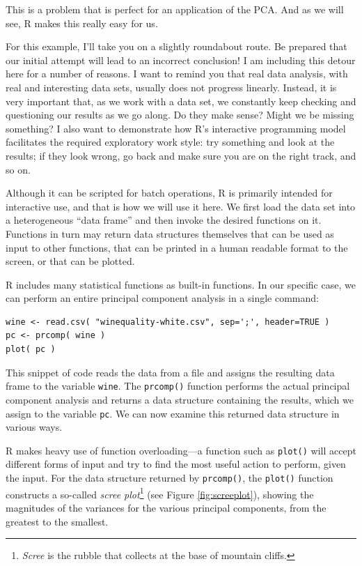This is a problem that is perfect for an application of the PCA. And
as we will see, R makes this really easy for us.

For this example, I'll take you on a slightly roundabout route.  Be
prepared that our initial attempt will lead to an incorrect
conclusion! I am including this detour here for a number of reasons.
I want to remind you that real data analysis, with real and
interesting data sets, usually does not progress linearly.  Instead,
it is very important that, as we work with a data set, we constantly
keep checking and questioning our results as we go along. Do they make
sense? Might we be missing something?  I also want to demonstrate how
R's interactive programming model facilitates the required exploratory
work style: try something and look at the results; if they look wrong,
go back and make sure you are on the right track, and so on.


Although it can be scripted for batch operations, R is primarily
intended for interactive use, and that is how we will use it here. We
first load the data set into a heterogeneous ``data frame'' and then
invoke the desired functions on it. Functions in turn may return data
structures themselves that can be used as input to other functions,
that can be printed in a human readable format to the screen, or that
can be plotted.

R includes many statistical functions as built-in functions. In our
specific case, we can perform an entire principal component analysis
in a single command:

\begin{verbatim}
wine <- read.csv( "winequality-white.csv", sep=';', header=TRUE )
pc <- prcomp( wine )
plot( pc )
\end{verbatim}

This snippet of code reads the data from a file and assigns the
resulting data frame to the variable \texttt{wine}. The
\texttt{prcomp()} function  performs the actual principal component
analysis and returns a data structure containing the results, which we
assign to the variable \texttt{pc}. We can now examine this returned
data structure in various ways.

R makes heavy use of function overloading---a function such as
\texttt{plot()}  will accept different forms of input and try to find
the most useful action to perform, given the input. For the data
structure returned by \texttt{prcomp()}, the \texttt{plot()} function
constructs a so-called \emph{scree plot}\footnote{{\it Scree} is the rubble that collects at the base of
mountain cliffs.} (see Figure
\ref{fig:screeplot}), showing the magnitudes of the variances for the
various principal components, from the greatest to the smallest.

